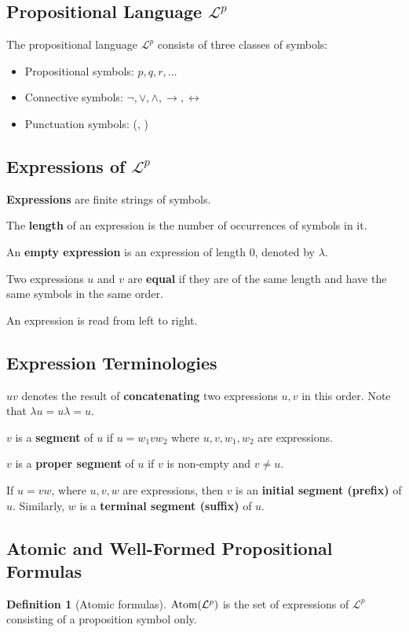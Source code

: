 \documentclass[11pt]{article}
\theoremstyle{definition}
\newtheorem{defn}[thm]{Definition}
\begin{document}
\subsection{Propositional Language $\mathcal{L}^p$}
The propositional language $\mathcal{L}^p$ consists of three classes of symbols: \vspace{-0.25cm}
\begin{itemize}
    \item Propositional symbols: $p, q, r, \dots$
    \item Connective symbols: $\neg, \vee, \wedge, \rightarrow, \leftrightarrow$
    \item Punctuation symbols: (, )
\end{itemize}
\vspace{-0.25cm}

\subsection{Expressions of $\mathcal{L}^p$}
{\bf Expressions} are finite strings of symbols. 

The {\bf length} of an expression is the number of occurrences of
symbols in it.

An {\bf empty expression} is an expression of length 0, denoted by $\lambda$.

Two expressions $u$ and $v$ are {\bf equal} if they are of the same
length and have the same symbols in the same order.

An expression is read from left to right.

\subsection{Expression Terminologies}
$uv$ denotes the result of {\bf concatenating} two expressions $u, v$ in
this order. Note that $\lambda u = u \lambda = u$.

$v$ is a {\bf segment} of $u$ if $u = w_1 v w_2$ where $u, v, w_1, w_2$ are
expressions.

$v$ is a {\bf proper segment} of $u$ if $v$ is non-empty and $v \ne u$.

If $u = vw$, where $u, v, w$ are expressions, then $v$ is an {\bf initial
segment (prefix)} of $u$. Similarly, $w$ is a {\bf terminal segment
(suffix)} of $u$.

\subsection{Atomic and Well-Formed Propositional Formulas}
\begin{defn}[Atomic formulas]
${\rm Atom}(\mathcal{L}^p)$ is the set of expressions of $\mathcal{L}^p$ consisting of a proposition symbol only.
\end{defn}
\end{document}
